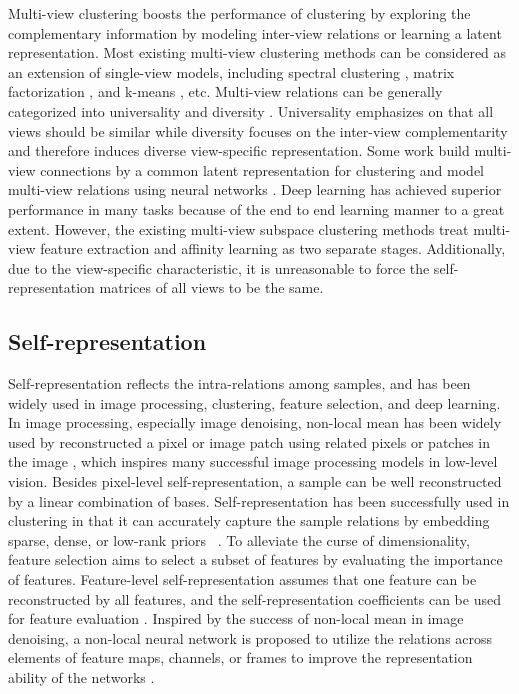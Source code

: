 \documentclass[journal]{IEEEtran}
\begin{document}
Multi-view clustering boosts the performance of clustering by exploring the complementary information by modeling inter-view relations or learning a latent representation.
Most existing multi-view clustering methods can be considered as an extension of single-view models, including spectral clustering \cite{Wang2015RobustSC}, matrix factorization \cite{Zhao2017MultiViewCV}, and k-means \cite{Xu2016DiscriminativelyEK}, etc.
Multi-view relations can be generally categorized into universality and diversity \cite{Gnnemann2012MultiviewCU,Wang2015RobustSC,Xu2016DiscriminativelyEK,Zhang2017LatentMS}.
Universality emphasizes on that all views should be similar while diversity focuses on the inter-view complementarity and therefore induces diverse view-specific representation.
Some work build multi-view connections by a common latent representation for clustering and model multi-view relations using neural networks \cite{ZhangGeneralized}.
Deep learning has achieved superior performance in many tasks because of the end to end learning manner to a great extent.
However, the existing multi-view subspace clustering methods treat multi-view feature extraction and affinity learning as two separate stages.
Additionally, due to the view-specific characteristic, it is unreasonable to force the self-representation matrices of all views to be the same.

\subsection{Self-representation}
Self-representation reflects the intra-relations among samples, and has been widely used in image processing, clustering, feature selection, and deep learning.
In image processing, especially image denoising, non-local mean has been widely used by reconstructed a pixel or image patch using related pixels or patches in the image \cite{buades2005non}, which inspires many successful image processing models in low-level vision.
Besides pixel-level self-representation, a sample can be well reconstructed by a linear combination of bases.
Self-representation has been successfully used in clustering in that it can accurately capture the sample relations by embedding sparse, dense, or low-rank priors ~\cite{Guangcan2013Robust,ji2017deep,Lu2018Subspace}.
To alleviate the curse of dimensionality, feature selection aims to select a subset of features by evaluating the importance of features.
Feature-level self-representation assumes that one feature can be reconstructed by all features, and the self-representation coefficients can be used for feature evaluation \cite{zhu2015unsupervised,zhu2016coupled,zhu2017subspace}.
Inspired by the success of non-local mean in image denoising, a non-local neural network is proposed to utilize the relations across elements of feature maps, channels, or frames to improve the representation ability of the networks \cite{wang2018non}.
\end{document}
